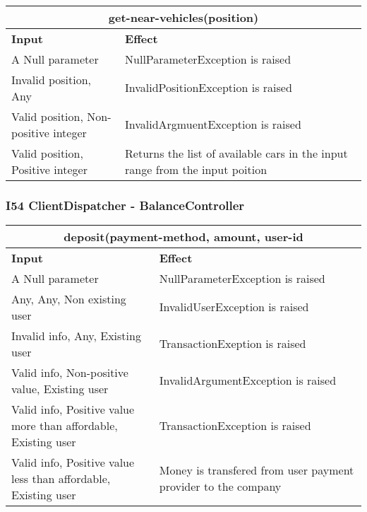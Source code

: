 \\
\begin{tabular}{|p{5cm}|p{7cm}|}
\hline
\multicolumn{2}{|c|}{get-near-vehicles(position)} \\
\hline
\textbf{Input} & \textbf{Effect} \\

\hline
A Null parameter & NullParameterException is raised \\

\hline
Invalid position, Any & InvalidPositionException is raised \\

\hline
Valid position, Non-positive integer & InvalidArgmuentException is raised \\

\hline
Valid position, Positive integer & Returns the list of available cars in the input range from the input poition \\
\hline
\end{tabular}
\subsubsection{I54 ClientDispatcher - BalanceController}
\begin{tabular}{|p{5cm}|p{7cm}|}
\hline
\multicolumn{2}{|c|}{deposit(payment-method, amount, user-id} \\
\hline
\textbf{Input} & \textbf{Effect} \\

\hline
A Null parameter & NullParameterException is raised \\

\hline
Any, Any, Non existing user & InvalidUserException is raised \\

\hline
Invalid info, Any, Existing user & TransactionExeption is raised \\

\hline
Valid info, Non-positive value, Existing user & InvalidArgumentException is raised \\

\hline
Valid info, Positive value more than aﬀordable, Existing user & TransactionException is raised \\

\hline
Valid info, Positive value less than aﬀordable, Existing user & Money is transfered from user payment provider to the company \\
\hline
\end{tabular}
